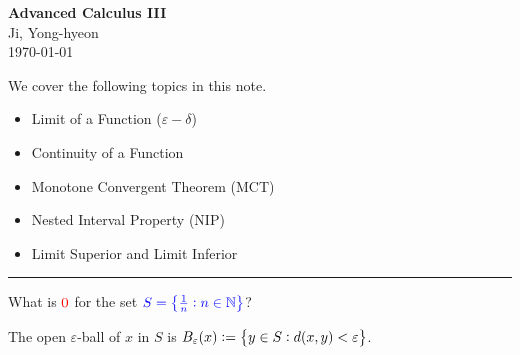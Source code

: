 \documentclass[11pt,openany]{article}
\begin{document}
\begin{center}
	\huge\textbf{Advanced Calculus III}\\
	\vspace{0.5em}
	\large{Ji, Yong-hyeon}\\
	\vspace{0.5em}
	\normalsize{\today}\\
\end{center}

\noindent 
We cover the following topics in this note.
\begin{itemize}
	\item Limit of a Function ($\varepsilon-\delta$)
	\item Continuity of a Function
	\item Monotone Convergent Theorem (MCT)
	\item Nested Interval Property (NIP)
	\item Limit Superior and Limit Inferior
\end{itemize}
\hrule\vspace{12pt}
What is $\textcolor{red}{0}$ for the set $\textcolor{blue}{S=\set{\frac{1}{n}:n\in\mathbb{N}}}$?
\begin{center}
\end{center}
\begin{note}
	The open $\varepsilon$-ball of $x$ in $S$ is $B_\varepsilon(x):=\set{y\in S:d(x,y)<\varepsilon}$.
\end{note}
\end{document}
